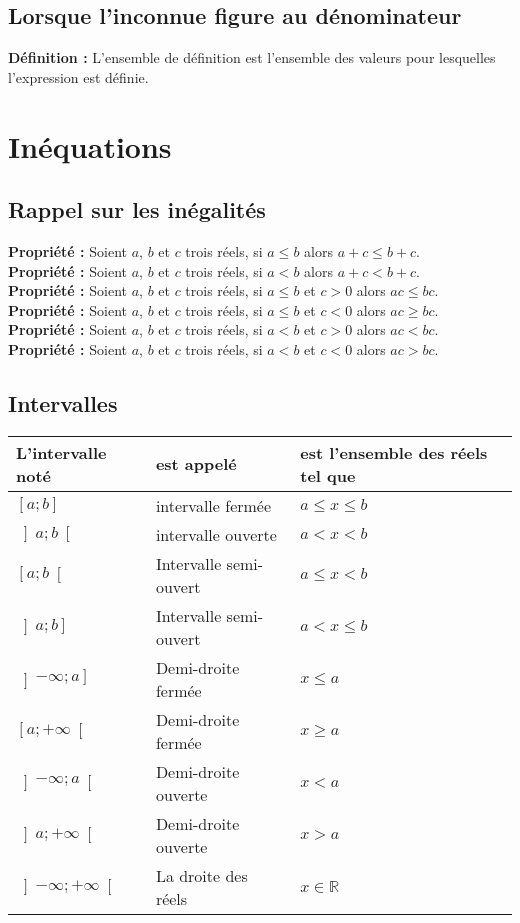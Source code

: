 \documentclass[a4paper,titlepage]{article}
\let\oldsection\section
\renewcommand\section{\clearpage\oldsection}
\begin{document}
    \subsection{Lorsque l’inconnue figure au dénominateur}
        \textbf{Définition :} L’ensemble de définition est l’ensemble des valeurs pour lesquelles l’expression est définie.
\section{Inéquations}
    \subsection{Rappel sur les inégalités}
        \textbf{Propriété :} Soient $a$, $b$ et $c$ trois réels, si $a\leqslant b$ alors $a+c\leqslant b+c$.
        \\
        \textbf{Propriété :} Soient $a$, $b$ et $c$ trois réels, si $a<b$ alors $a+c<b+c$.
        \\
        \textbf{Propriété :} Soient $a$, $b$ et $c$ trois réels, si $a\leqslant b$ et $c>0$ alors $ac\leqslant bc$.
        \\
        \textbf{Propriété :} Soient $a$, $b$ et $c$ trois réels, si $a\leqslant b$ et $c<0$ alors $ac\geqslant bc$.
        \\
        \textbf{Propriété :} Soient $a$, $b$ et $c$ trois réels, si $a<b$ et $c>0$ alors $ac<bc$.
        \\
        \textbf{Propriété :} Soient $a$, $b$ et $c$ trois réels, si $a<b$ et $c<0$ alors $ac>bc$.
    \subsection{Intervalles}
        \begin{tabularx}{\linewidth}{|Y|Y|Y|}
            \hline
            {\textbf{L’intervalle noté}} & \textbf{est appelé} & \textbf{est l’ensemble des réels tel que} \\
            \hline
            $\left[a;b\right]$ & intervalle fermée & $a\leqslant x\leqslant b$ \\
            \hline
            $\left]a;b\right[$ & intervalle ouverte & $a<x<b$ \\
            \hline
            $\left[a;b\right[$ & Intervalle semi-ouvert & $a\leqslant x<b$ \\
            \hline
            $\left]a;b\right]$ & Intervalle semi-ouvert & $a<x\leqslant b$ \\
            \hline
            $\left]-\infty;a\right]$ & Demi-droite fermée & $x\leqslant a$ \\
            \hline
            $\left[a;+\infty\right[$ & Demi-droite fermée & $x\geqslant a$ \\
            \hline
            $\left]-\infty;a\right[$ & Demi-droite ouverte & $x<a$ \\
            \hline
            $\left]a;+\infty\right[$ & Demi-droite ouverte & $x>a$ \\
            \hline
            $\left]-\infty;+\infty\right[$ & La droite des réels & $x\in\mathbb{R}$ \\
            \hline
        \end{tabularx}
\end{document}
